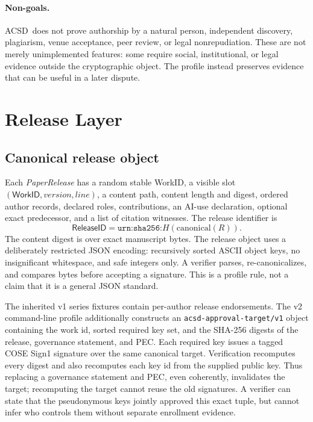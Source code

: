 \documentclass[11pt]{article}
\newcommand{\workid}{\textsf{WorkID}}
\newcommand{\releaseid}{\textsf{ReleaseID}}
\newcommand{\acsd}{\textsc{ACSD}}
\begin{document}
\paragraph{Non-goals.} \acsd\ does not prove authorship by a natural person, independent discovery, plagiarism, venue acceptance, peer review, or legal nonrepudiation. These are not merely unimplemented features: some require social, institutional, or legal evidence outside the cryptographic object. The profile instead preserves evidence that can be useful in a later dispute.

\section{Release Layer}

\subsection{Canonical release object}

Each \emph{PaperRelease} has a random stable \workid, a visible slot $(\workid,\textit{version},\textit{line})$, a content path, content length and digest, ordered author records, declared roles, contributions, an AI-use declaration, optional exact predecessor, and a list of citation witnesses. The release identifier is
\[
  \releaseid = \texttt{urn:sha256:}H(\mathrm{canonical}(R)).
\]
The content digest is over exact manuscript bytes. The release object uses a deliberately restricted JSON encoding: recursively sorted ASCII object keys, no insignificant whitespace, and safe integers only. A verifier parses, re-canonicalizes, and compares bytes before accepting a signature. This is a profile rule, not a claim that it is a general JSON standard.

The inherited v1 series fixtures contain per-author release endorsements.  The
v2 command-line profile additionally constructs an
\texttt{acsd-approval-target/v1} object containing the work id, sorted required
key set, and the SHA-256 digests of the release, governance statement, and PEC.
Each required key issues a tagged COSE Sign1 signature over the same canonical
target.  Verification recomputes every digest and also recomputes each key id
from the supplied public key. Thus replacing a governance statement and PEC,
even coherently, invalidates the target; recomputing the target cannot reuse the
old signatures. A verifier can state that the pseudonymous keys jointly
approved this exact tuple, but cannot infer who controls them without separate
enrollment evidence.
\end{document}
